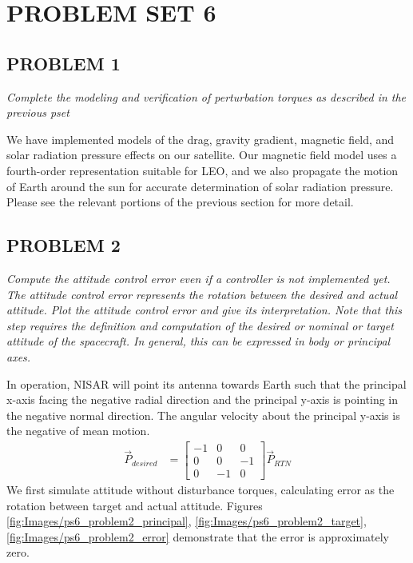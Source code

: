 \section{\Large PROBLEM SET 6}
\subsection{PROBLEM 1}
\textit{Complete the modeling and verification of perturbation torques as described in the previous pset}

We have implemented models of the drag, gravity gradient, magnetic field, and solar radiation pressure effects on our satellite. Our magnetic field model uses a fourth-order representation suitable for LEO, and we also propagate the motion of Earth around the sun for accurate determination of solar radiation pressure. Please see the relevant portions of the previous section for more detail.


\subsection{PROBLEM 2}
\textit{Compute the attitude control error even if a controller is not implemented yet. The attitude control error represents the rotation between the desired and actual attitude. Plot the attitude control error and give its interpretation. Note that this step requires the definition and computation of the desired or nominal or target attitude of the spacecraft. In general, this can be expressed in body or principal axes.}

In operation, NISAR will point its antenna towards Earth such that the principal x-axis facing the negative radial direction and the principal y-axis is pointing in the negative normal direction. The angular velocity about the principal y-axis is the negative of mean motion.
\begin{align*}
    \Vec{P}_{desired} &= 
    \begin{bmatrix}
    -1 & 0 & 0 \\
    0 & 0 & -1 \\
    0 & -1 & 0
    \end{bmatrix}
    \Vec{P}_{RTN}
\end{align*}
We first simulate attitude without disturbance torques, calculating error as the rotation between target and actual attitude. Figures \ref{fig:Images/ps6_problem2_principal}, \ref{fig:Images/ps6_problem2_target}, \ref{fig:Images/ps6_problem2_error} demonstrate that the error is approximately zero.

